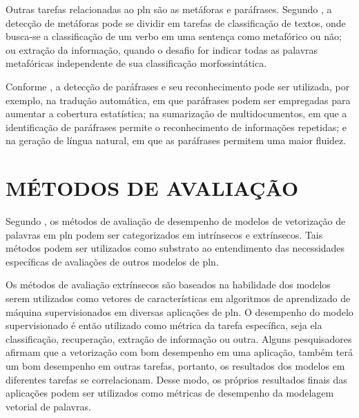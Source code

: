 Outras tarefas relacionadas ao \gls{pln} são as metáforas e paráfrases. Segundo \textcite{Gao2018NeuralMetaphoDetection}, a detecção de metáforas pode se dividir em tarefas de classificação de textos, onde busca-se a classificação de um verbo em uma sentença como metafórico ou não; ou extração da informação, quando o desafio for indicar todas as palavras metafóricas independente de sua classificação morfossintática.

Conforme \textcite{Polastri2016Aprendizado}, a detecção de paráfrases e seu reconhecimento pode ser utilizada, por exemplo, na tradução automática, em que paráfrases podem ser empregadas para aumentar a cobertura estatística; na sumarização de multidocumentos, em que a identificação de paráfrases permite o reconhecimento de informações repetidas; e na geração de língua natural, em que as paráfrases permitem uma maior fluidez.


\section{MÉTODOS DE AVALIAÇÃO}
\label{sec:pln-metodos-avaliacao}


Segundo \textcite{Bakarov2018SurveyWordEmbeddings}, os métodos de avaliação de desempenho de modelos de vetorização de palavras em \gls{pln} podem ser categorizados em intrínsecos e extrínsecos. Tais métodos podem ser utilizados como substrato ao entendimento das necessidades específicas de avaliações de outros modelos de \gls{pln}.

Os métodos de avaliação extrínsecos são baseados na habilidade dos modelos serem utilizados como vetores de características em algoritmos de aprendizado de máquina supervisionados em diversas aplicações de \gls{pln}. O desempenho do modelo supervisionado é então utilizado como métrica da tarefa específica, seja ela classificação, recuperação, extração de informação ou outra. Alguns pesquisadores afirmam que a vetorização com bom desempenho em uma aplicação, também terá um bom desempenho em outras tarefas, portanto, os resultados dos modelos em diferentes tarefas se correlacionam. Desse modo, os próprios resultados finais das aplicações podem ser utilizados como métricas de desempenho da modelagem vetorial de palavras.

